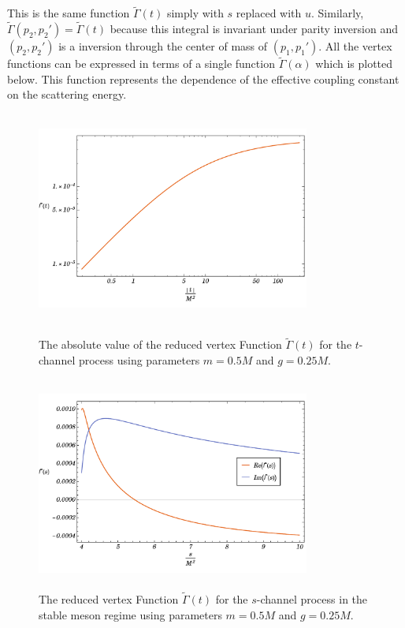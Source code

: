 \documentclass[12pt]{extarticle}
\begin{document}
This is the same function $\tilde{\Gamma}(t)$ simply with $s$ replaced with $u$. Similarly, $\tilde{\Gamma}(p_2, p_2') = \tilde{\Gamma}(t)$ because this integral is invariant under parity inversion and $(p_2, p_2')$ is a inversion through the center of mass of $(p_1, p_1')$.
All the vertex functions can be expressed in terms of a single function $\tilde{\Gamma}(\alpha)$ which is plotted below. This function represents the dependence of the effective coupling constant on the scattering energy.

\begin{figure}[!htb]
    \centering
    \begin{minipage}[b]{.45\textwidth}
        \centering
        \includegraphics[width=9cm, height=7cm]	{Gamma-t-channel}
        \caption{The absolute value of the reduced vertex Function $\tilde{\Gamma}(t)$ for the $t$-channel process using parameters $m = 0.5M$ and $g = 0.25M$.}
        \label{fig:gamma1}
    \end{minipage}%
    \hfill
    \begin{minipage}[b]{0.45\textwidth}
        \centering
        \includegraphics[width=9cm, height=7cm]{Gamma-s-channel}
        \caption{The reduced vertex Function $\tilde{\Gamma}(t)$ for the $s$-channel process in the stable meson regime using parameters $m = 0.5M$ and $g = 0.25M$.}
        \label{fig:gamma1}
    \end{minipage}
\end{figure}
\end{document}

